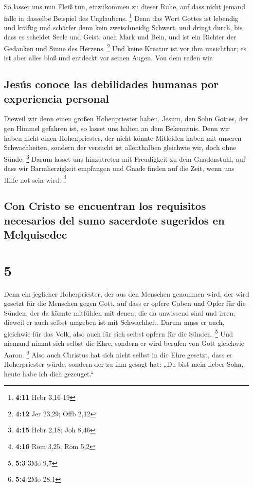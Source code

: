  So lasset uns nun Fleiß tun, einzukommen zu dieser Ruhe,
auf dass nicht jemand falle in dasselbe Beispiel des Unglaubens.
\footnote{\textbf{4:11} Hebr 3,16-19}  Denn das Wort
Gottes ist lebendig und kräftig und schärfer denn kein zweischneidig
Schwert, und dringt durch, bis dass es scheidet Seele und Geist, auch
Mark und Bein, und ist ein Richter der Gedanken und Sinne des Herzens.
\footnote{\textbf{4:12} Jer 23,29; Offb 2,12}  Und keine
Kreatur ist vor ihm unsichtbar; es ist aber alles bloß und entdeckt vor
seinen Augen. Von dem reden wir.

\hypertarget{jesuxfas-conoce-las-debilidades-humanas-por-experiencia-personal}{%
\subsection{Jesús conoce las debilidades humanas por experiencia
personal}\label{jesuxfas-conoce-las-debilidades-humanas-por-experiencia-personal}}

 Dieweil wir denn einen großen Hohenpriester haben,
Jesum, den Sohn Gottes, der gen Himmel gefahren ist, so lasset uns
halten an dem Bekenntnis.  Denn wir haben nicht einen
Hohenpriester, der nicht könnte Mitleiden haben mit unseren
Schwachheiten, sondern der versucht ist allenthalben gleichwie wir, doch
ohne Sünde. \footnote{\textbf{4:15} Hebr 2,18; Joh 8,46} 
Darum lasset uns hinzutreten mit Freudigkeit zu dem Gnadenstuhl, auf
dass wir Barmherzigkeit empfangen und Gnade finden auf die Zeit, wenn
uns Hilfe not sein wird. \footnote{\textbf{4:16} Röm 3,25; Röm 5,2}

\hypertarget{con-cristo-se-encuentran-los-requisitos-necesarios-del-sumo-sacerdote-sugeridos-en-melquisedec}{%
\subsection{Con Cristo se encuentran los requisitos necesarios del sumo
sacerdote sugeridos en
Melquisedec}\label{con-cristo-se-encuentran-los-requisitos-necesarios-del-sumo-sacerdote-sugeridos-en-melquisedec}}

\hypertarget{section-4}{%
\section{5}\label{section-4}}

 Denn ein jeglicher Hoherpriester, der aus den Menschen
genommen wird, der wird gesetzt für die Menschen gegen Gott, auf dass er
opfere Gaben und Opfer für die Sünden;  der da könnte
mitfühlen mit denen, die da unwissend sind und irren, dieweil er auch
selbst umgeben ist mit Schwachheit.  Darum muss er auch,
gleichwie für das Volk, also auch für sich selbst opfern für die Sünden.
\footnote{\textbf{5:3} 3Mo 9,7}  Und niemand nimmt sich
selbst die Ehre, sondern er wird berufen von Gott gleichwie Aaron.
\footnote{\textbf{5:4} 2Mo 28,1}  Also auch Christus hat
sich nicht selbst in die Ehre gesetzt, dass er Hoherpriester würde,
sondern der zu ihm gesagt hat: „Du bist mein lieber Sohn, heute habe ich
dich gezeuget.``

